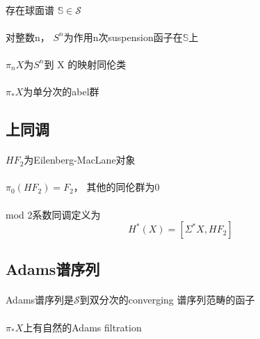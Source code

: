 \documentclass[12pt,a4paper]{article}
\begin{document}
\begin{sloppy}
\paragraph{}
存在球面谱 $\mathbb{S}\in \mathcal{S}$

\paragraph{}
对整数n，
$S^n$为作用n次suspension函子在$\mathbb{S}$上

\paragraph{}
$\pi_nX$为$S^n$到 X 的映射同伦类

\paragraph{}
$\pi_*X$为单分次的abel群

\subsection{上同调}

\paragraph{}
$HF_2$为Eilenberg-MacLane对象

\paragraph{}
$\pi_0(HF_2)=F_2$， 其他的同伦群为0

\paragraph{}
mod 2系数同调定义为
$$H^*(X) = [\Sigma^*X,HF_2]$$

\subsection{Adams谱序列}

\paragraph{}Adams谱序列是$\mathcal{S}$到双分次的converging
谱序列范畴的函子

\paragraph{}
$\pi_*X$上有自然的Adams filtration


\end{sloppy}
\end{document}
